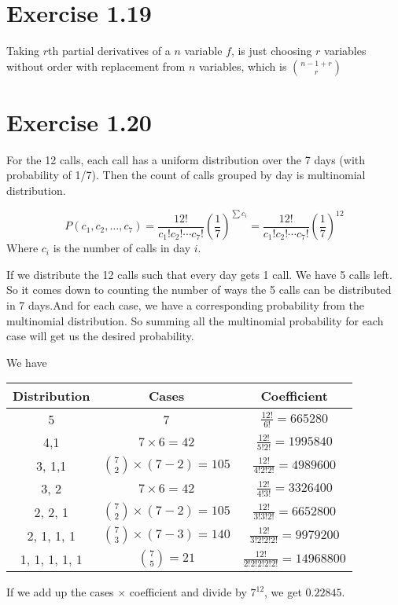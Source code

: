 \documentclass[12pt]{article}
\begin{document}
\section*{Exercise 1.19}
Taking $r$th partial derivatives of a $n$ variable $f$, is just choosing $r$ variables without order with replacement from $n$ variables, which is ${n-1 + r \choose r}$

\section*{Exercise 1.20}
For the 12 calls, each call has a uniform distribution over the 7 days (with probability of 1/7). Then the count of calls grouped by day is multinomial distribution. 

$$P(c_1, c_2, \ldots, c_7) = \frac{12!}{c_1!c_2!\cdots c_7!} \left(\frac{1}{7}\right)^{\sum c_i} =  \frac{12!}{c_1!c_2!\cdots c_7!} \left(\frac{1}{7}\right)^{12}$$
Where $c_i$ is the number of calls in day $i$.

If we distribute the 12 calls such that every day gets 1 call. We have 5 calls left. So it comes down to counting the number of ways the 5 calls can be distributed in 7 days.And for each case, we have a corresponding probability from the multinomial distribution. So summing all the multinomial probability for each case will get us the desired probability.

We have
\begin{center}
	\begin{tabular}{| c |c |c| }
		\hline
		Distribution & Cases & Coefficient \\ 
		\hline
		5 & 7 & $\frac{12!}{6!} = 665280$ \\  
		\hline
		4,1 & $7 \times 6 = 42$ & $\frac{12!}{5!2!}= 1995840$  \\
		\hline
		3, 1,1 & ${7 \choose 2} \times (7-2) = 105 $ &  $\frac{12!}{4!2!2!}= 4989600$ \\
		\hline
		3, 2 &  $7 \times 6 = 42$ & $\frac{12!}{4!3!}=3326400$ \\
		\hline
		2, 2, 1&  ${7 \choose 2} \times (7-2) = 105 $ & $\frac{12!}{3!3!2!} = 6652800$ \\
		\hline
		2, 1, 1, 1&  ${7 \choose 3} \times (7-3) = 140$ & $\frac{12!}{3!2!2!2!} = 9979200$ \\
		\hline
		1, 1, 1, 1, 1&  ${7 \choose 5 }= 21$ & $\frac{12!}{2!2!2!2!2!} = 14968800$ \\
		\hline
	\end{tabular}
\end{center}
If we add up the cases $\times$ coefficient and divide by $7^{12}$, we get $0.22845$.
\end{document}
